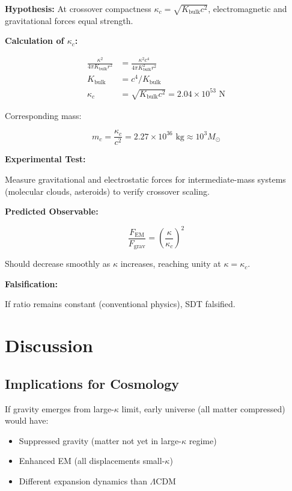 \textbf{Hypothesis:} At crossover compactness $\kappa_c = \sqrt{K_{\text{bulk}} c^2}$, electromagnetic and gravitational forces equal strength.

\textbf{Calculation of $\kappa_c$:}

\begin{align}
\frac{\kappa^2}{4\pi K_{\text{bulk}} r^2} &= \frac{\kappa^2 c^4}{4\pi K_{\text{bulk}}^2 r^2} \\
K_{\text{bulk}} &= c^4 / K_{\text{bulk}} \\
\kappa_c &= \sqrt{K_{\text{bulk}} c^2} = 2.04 \times 10^{53} \text{ N}
\end{align}

Corresponding mass:

\begin{equation}
m_c = \frac{\kappa_c}{c^2} = 2.27 \times 10^{36} \text{ kg} \approx 10^{3} M_\odot
\end{equation}

\textbf{Experimental Test:}

Measure gravitational and electrostatic forces for intermediate-mass systems (molecular clouds, asteroids) to verify crossover scaling.

\textbf{Predicted Observable:}

\begin{equation}
\frac{F_{\text{EM}}}{F_{\text{grav}}} = \left(\frac{\kappa}{\kappa_c}\right)^2
\end{equation}

Should decrease smoothly as $\kappa$ increases, reaching unity at $\kappa = \kappa_c$.

\textbf{Falsification:}

If ratio remains constant (conventional physics), SDT falsified.

\section{Discussion}

\subsection{Implications for Cosmology}

If gravity emerges from large-$\kappa$ limit, early universe (all matter compressed) would have:

\begin{itemize}
\item Suppressed gravity (matter not yet in large-$\kappa$ regime)
\item Enhanced EM (all displacements small-$\kappa$)
\item Different expansion dynamics than $\Lambda$CDM
\end{itemize}

